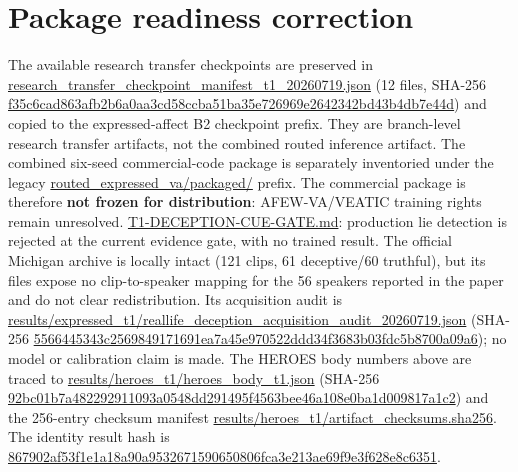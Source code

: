\documentclass[11pt]{article}
\renewcommand{\texttt}[1]{\url{#1}}
\begin{document}
\section*{Package readiness correction}
The available research transfer checkpoints are preserved in
\texttt{research_transfer_checkpoint_manifest_t1_20260719.json} (12 files,
SHA-256 \texttt{f35c6cad863afb2b6a0aa3cd58ccba51ba35e726969e2642342bd43b4db7e44d})
and copied to the expressed-affect B2 checkpoint prefix. They are branch-level
research transfer artifacts, not the combined routed inference artifact. The
combined six-seed commercial-code package is separately inventoried under the
legacy \texttt{routed_expressed_va/packaged/} prefix. The commercial package
is therefore \textbf{not frozen for distribution}: AFEW-VA/VEATIC training
rights remain unresolved.
\texttt{T1-DECEPTION-CUE-GATE.md}: production lie detection is rejected at the
current evidence gate, with no trained result. The official Michigan archive
is locally intact (121 clips, 61 deceptive/60 truthful), but its files expose
no clip-to-speaker mapping for the 56 speakers reported in the paper and do
not clear redistribution. Its acquisition audit is
\texttt{results/expressed_t1/reallife_deception_acquisition_audit_20260719.json}
(SHA-256 \texttt{5566445343c2569849171691ea7a45e970522ddd34f3683b03fdc5b8700a09a6});
no model or calibration claim is made. The HEROES body numbers above
are traced to
\texttt{results/heroes_t1/heroes_body_t1.json} (SHA-256
\texttt{92bc01b7a482292911093a0548dd291495f4563bee46a108e0ba1d009817a1c2})
and the 256-entry checksum manifest
\texttt{results/heroes_t1/artifact_checksums.sha256}.
The identity result hash is
\texttt{867902af53f1e1a18a90a9532671590650806fca3e213ae69f9e3f628e8c6351}.
\end{document}
